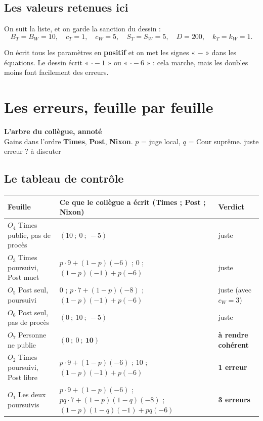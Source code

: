 \documentclass[11pt,a4paper]{article}
\theoremstyle{definition}
\begin{document}
\subsection{Les valeurs retenues ici}
On suit la liste, et on garde la sanction du dessin :
\[
B_T=B_W=10,\quad c_T=1,\quad c_W=5,\quad S_T=S_W=5,\quad D=200,\quad k_T=k_W=1 .
\]
\begin{simple}
On écrit tous les paramètres en \textbf{positif} et on met les signes « $-$ » dans les équations. Le dessin écrit « $\cdot-1$ » ou « $\cdot-6$ » : cela marche, mais les doubles moins font facilement des erreurs.
\end{simple}

\section{Les erreurs, feuille par feuille}
\begin{landscape}
\begin{center}{\large\bfseries L'arbre du collègue, annoté}\\[2pt]{\small Gains dans l'ordre \textcolor{nyt}{\textbf{Times}}, \textcolor{wp}{\textbf{Post}}, \textcolor{gov}{\textbf{Nixon}}. $p$ = juge local, $q$ = Cour suprême. \textcolor{wp}{} juste \quad \textcolor{gov}{} erreur \quad \textcolor{nat}{?} à discuter}\end{center}\vspace{-4pt}
\noindent\resizebox{\linewidth}{!}{}
\end{landscape}


\subsection{Le tableau de contrôle}
\begin{center}
\small
\begin{tabularx}{\textwidth}{@{}l>{\raggedright\arraybackslash}Xl@{}}
\toprule
Feuille & Ce que le collègue a écrit (Times ; Post ; Nixon) & Verdict \\
\midrule
$O_4$ Times publie, pas de procès & $(10\ ;\ 0\ ;\ -5)$ & juste \\
$O_3$ Times poursuivi, Post muet & $p\cdot9+(1-p)(-6)$ ; $0$ ; $(1-p)(-1)+p(-6)$ & juste \\
$O_5$ Post seul, poursuivi & $0$ ; $p\cdot7+(1-p)(-8)$ ; $(1-p)(-1)+p(-6)$ & juste (avec $c_W=3$) \\
$O_6$ Post seul, pas de procès & $(0\ ;\ 10\ ;\ -5)$ & juste \\
$O_7$ Personne ne publie & $(0\ ;\ 0\ ;\ \mathbf{10})$ & \textbf{à rendre cohérent} \\
$O_2$ Times poursuivi, Post libre & $p\cdot9+(1-p)(-6)$ ; $10$ ; $(1-p)(-1)+p(-6)$ & \textbf{1 erreur} \\
$O_1$ Les deux poursuivis & $p\cdot9+(1-p)(-6)$ ; $pq\cdot7+(1-p)(1-q)(-8)$ ; $(1-p)(1-q)(-1)+pq(-6)$ & \textbf{3 erreurs} \\
\bottomrule
\end{tabularx}
\end{center}
\end{document}
